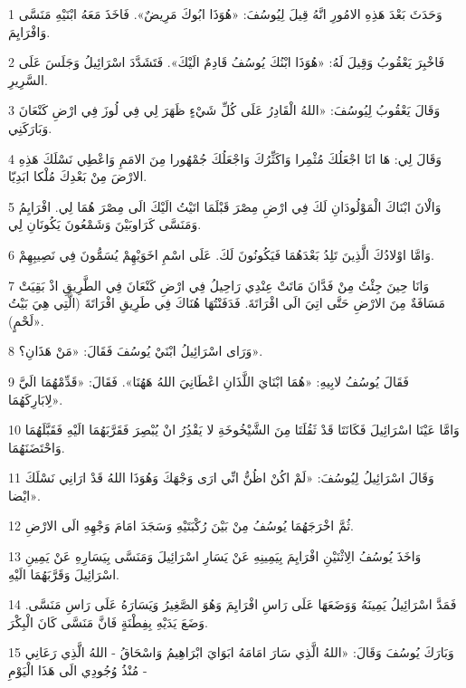\par 1 وَحَدَثَ بَعْدَ هَذِهِ الامُورِ انَّهُ قِيلَ لِيُوسُفَ: «هُوَذَا ابُوكَ مَرِيضٌ». فَاخَذَ مَعَهُ ابْنَيْهِ مَنَسَّى وَافْرَايِمَ.
\par 2 فَاخْبِرَ يَعْقُوبُ وَقِيلَ لَهُ: «هُوَذَا ابْنُكَ يُوسُفُ قَادِمٌ الَيْكَ». فَتَشَدَّدَ اسْرَائِيلُ وَجَلَسَ عَلَى السَّرِيرِ.
\par 3 وَقَالَ يَعْقُوبُ لِيُوسُفَ: «اللهُ الْقَادِرُ عَلَى كُلِّ شَيْءٍ ظَهَرَ لِي فِي لُوزَ فِي ارْضِ كَنْعَانَ وَبَارَكَنِي.
\par 4 وَقَالَ لِي: هَا انَا اجْعَلُكَ مُثْمِرا وَاكَثِّرُكَ وَاجْعَلُكَ جُمْهُورا مِنَ الامَمِ وَاعْطِي نَسْلَكَ هَذِهِ الارْضَ مِنْ بَعْدِكَ مُلْكا ابَدِيّا.
\par 5 وَالْانَ ابْنَاكَ الْمَوْلُودَانِ لَكَ فِي ارْضِ مِصْرَ قَبْلَمَا اتَيْتُ الَيْكَ الَى مِصْرَ هُمَا لِي. افْرَايِمُ وَمَنَسَّى كَرَاوبَيْنَ وَشَمْعُونَ يَكُونَانِ لِي.
\par 6 وَامَّا اوْلادُكَ الَّذِينَ تَلِدُ بَعْدَهُمَا فَيَكُونُونَ لَكَ. عَلَى اسْمِ اخَوَيْهِمْ يُسَمُّونَ فِي نَصِيبِهِمْ.
\par 7 وَانَا حِينَ جِئْتُ مِنْ فَدَّانَ مَاتَتْ عِنْدِي رَاحِيلُ فِي ارْضِ كَنْعَانَ فِي الطَّرِيقِ اذْ بَقِيَتْ مَسَافَةٌ مِنَ الارْضِ حَتَّى اتِيَ الَى افْرَاتَةَ. فَدَفَنْتُهَا هُنَاكَ فِي طَرِيقِ افْرَاتَةَ (الَّتِي هِيَ بَيْتُ لَحْمٍ)».
\par 8 وَرَاى اسْرَائِيلُ ابْنَيْ يُوسُفَ فَقَالَ: «مَنْ هَذَانِ؟».
\par 9 فَقَالَ يُوسُفُ لابِيهِ: «هُمَا ابْنَايَ اللَّذَانِ اعْطَانِيَ اللهُ هَهُنَا». فَقَالَ: «قَدِّمْهُمَا الَيَّ لِابَارِكَهُمَا».
\par 10 وَامَّا عَيْنَا اسْرَائِيلَ فَكَانَتَا قَدْ ثَقُلَتَا مِنَ الشَّيْخُوخَةِ لا يَقْدُِرُ انْ يُبْصِرَ فَقَرَّبَهُمَا الَيْهِ فَقَبَّلَهُمَا وَاحْتَضَنَهُمَا.
\par 11 وَقَالَ اسْرَائِيلُ لِيُوسُفَ: «لَمْ اكُنْ اظُنُّ انِّي ارَى وَجْهَكَ وَهُوَذَا اللهُ قَدْ ارَانِي نَسْلَكَ ايْضا».
\par 12 ثُمَّ اخْرَجَهُمَا يُوسُفُ مِنْ بَيْنَ رُكْبَتَيْهِ وَسَجَدَ امَامَ وَجْهِهِ الَى الارْضِ.
\par 13 وَاخَذَ يُوسُفُ الِاثْنَيْنِ افْرَايِمَ بِيَمِينِهِ عَنْ يَسَارِ اسْرَائِيلَ وَمَنَسَّى بِيَسَارِهِ عَنْ يَمِينِ اسْرَائِيلَ وَقَرَّبَهُمَا الَيْهِ.
\par 14 فَمَدَّ اسْرَائِيلُ يَمِينَهُ وَوَضَعَهَا عَلَى رَاسِ افْرَايِمَ وَهُوَ الصَّغِيرُ وَيَسَارَهُ عَلَى رَاسِ مَنَسَّى. وَضَعَ يَدَيْهِ بِفِطْنَةٍ فَانَّ مَنَسَّى كَانَ الْبِكْرَ.
\par 15 وَبَارَكَ يُوسُفَ وَقَالَ: «اللهُ الَّذِي سَارَ امَامَهُ ابَوَايَ ابْرَاهِيمُ وَاسْحَاقُ - اللهُ الَّذِي رَعَانِي مُنْذُ وُجُودِي الَى هَذَا الْيَوْمِ -
